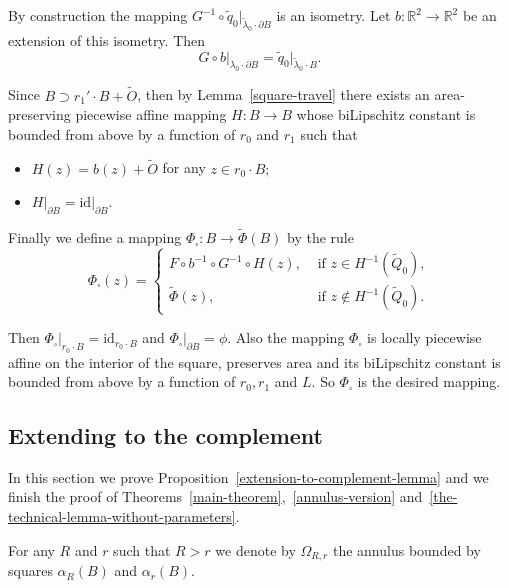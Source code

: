 \documentclass[12pt]{article}
\theoremstyle{definition}
\begin{document}
By construction the mapping $G^{-1}\circ\widetilde q_0\big|_{\widetilde\lambda_0\cdot\partial B}$ is an isometry. Let $b:\mathbb R^2\to\mathbb R^2$ be an extension of this isometry. Then
$$
G\circ b\big|_{\lambda_0\cdot \partial B} = \widetilde q_0\big|_{\widetilde\lambda_0\cdot B}.
$$

Since $B\supset r_1'\cdot B  + \widetilde O$, then by Lemma~\ref{square-travel} there exists an area-preserving piecewise affine mapping $H:B\to B$ whose biLipschitz constant is bounded from above by a function of $r_0$ and $r_1$ such that
\begin{itemize}
\item $H(z) = b(z) + \widetilde O$ for any $z\in r_0\cdot B;$
\item $H\big|_{\partial B} = \mathrm{id}\big|_{\partial B}.$
\end{itemize}

Finally we define a mapping $\Phi_{\square}:B\to \widetilde \Phi(B)$ by the rule
$$
\Phi_{\square}(z) = 
\left\{
\begin{aligned}
F \circ b^{-1} \circ G^{-1} \circ H(z),& \text{ if } z\in H^{-1}\left(\widetilde Q_0\right),\\
\widetilde\Phi(z),& \text{ if } z\notin H^{-1}\left(\widetilde Q_0\right).
\end{aligned}
\right.
$$

Then $\Phi_{\square}\big|_{r_0\cdot B} = \mathrm{id}_{r_0\cdot B}$ and $\Phi_{\square}\big|_{\partial B} = \phi.$ Also the mapping $\Phi_{\square}$ is locally piecewise affine on the interior of the square, preserves area and its biLipschitz constant is bounded from above by a function of $r_0, r_1$ and $L.$ So $\Phi_{\square}$ is the desired mapping.

\subsection{Extending to the complement}
\label{extension-to-complement}
In this section we prove Proposition~\ref{extension-to-complement-lemma} and we finish the proof of Theorems~\ref{main-theorem},~\ref{annulus-version} and~\ref{the-technical-lemma-without-parameters}.

For any $R$ and $r$ such that $R>r$ we denote by $\Omega_{R,r}$ the annulus bounded by squares $\alpha_R(B)$ and $\alpha_r(B).$
\end{document}
